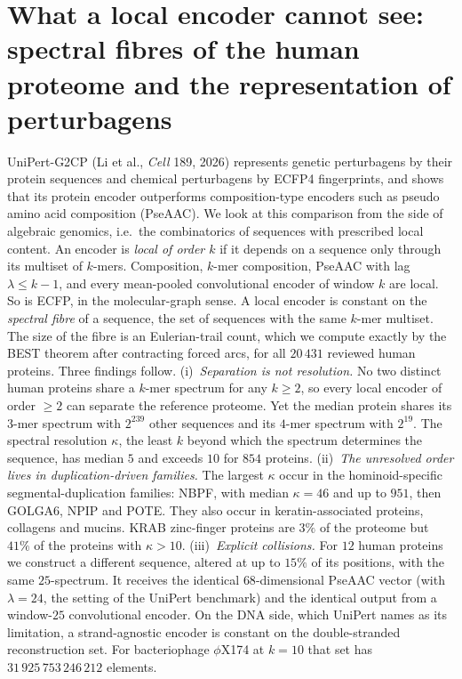 \chapter[What a local encoder cannot see]{What a local encoder cannot see: spectral fibres of the human proteome and the representation of perturbagens}\label{chap:ch12}
\par\medskip
\begin{chaptersummary}
UniPert-G2CP (Li et al., \emph{Cell} 189, 2026) represents genetic perturbagens by their protein
sequences and chemical perturbagens by ECFP4 fingerprints, and shows that its protein encoder
outperforms composition-type encoders such as pseudo amino acid composition (PseAAC). We look at
this comparison from the side of algebraic genomics, i.e.\ the combinatorics of sequences with
prescribed local content. An encoder is \emph{local of order $k$} if it depends on a sequence only
through its multiset of $k$-mers. Composition, $k$-mer composition, PseAAC with lag $\lambda\le k-1$,
and every mean-pooled convolutional encoder of window $k$ are local. So is ECFP, in the
molecular-graph sense. A local encoder is constant on the \emph{spectral fibre} of a sequence, the
set of sequences with the same $k$-mer multiset. The size of the fibre is an Eulerian-trail count,
which we compute exactly by the BEST theorem after contracting forced arcs, for all $20\,431$
reviewed human proteins. Three findings follow.
(i)~\emph{Separation is not resolution.} No two distinct human proteins share a $k$-mer spectrum
for any $k\ge2$, so every local encoder of order $\ge2$ can separate the reference proteome. Yet the
median protein shares its $3$-mer spectrum with $2^{239}$ other sequences and its $4$-mer spectrum
with $2^{19}$. The spectral resolution $\kappa$, the least $k$ beyond which the spectrum determines
the sequence, has median $5$ and exceeds $10$ for $854$ proteins.
(ii)~\emph{The unresolved order lives in duplication-driven families.} The largest $\kappa$ occur in
the hominoid-specific segmental-duplication families: NBPF, with median $\kappa=46$ and up to $951$,
then GOLGA6, NPIP and POTE. They also occur in keratin-associated proteins, collagens and mucins.
KRAB zinc-finger proteins are $3\%$ of the proteome but $41\%$ of the proteins with $\kappa>10$.
(iii)~\emph{Explicit collisions.} For $12$ human proteins we construct a different sequence, altered at
up to $15\%$ of its positions, with the same $25$-spectrum. It receives the identical $68$-dimensional
PseAAC vector (with $\lambda=24$, the setting of the UniPert benchmark) and the identical output from a
window-$25$ convolutional encoder. On the DNA side, which UniPert names as its limitation, a
strand-agnostic encoder is constant on the double-stranded reconstruction set. For bacteriophage
$\phi$X174 at $k=10$ that set has $31\,925\,753\,246\,212$ elements.
\end{chaptersummary}

